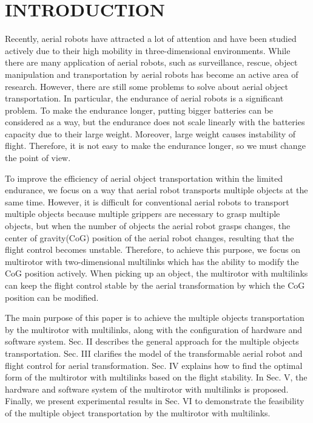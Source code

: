 \section{INTRODUCTION}
Recently, aerial robots have attracted a lot of attention and have been studied actively due to their high mobility in three-dimensional environments\cite{Kumar2012}. While there are many application of aerial robots, such as surveillance\cite{surveillance}, rescue\cite{rescue}, object manipulation and transportation by aerial robots has become an active area of research\cite{lindsey2012}\cite{Mellinger2011}\cite{ZhaoICRA2017}\cite{Bernard2009}\cite{Hugh2012}. However, there are still some problems to solve about aerial object transportation. In particular, the endurance of aerial robots is a significant problem. To make the endurance longer, putting bigger batteries can be considered as a way, but the endurance does not scale linearly with the batteries capacity due to their large weight. Moreover, large weight causes instability of flight. Therefore, it is not easy to make the endurance longer, so we must change the point of view. 
\par
To improve the efficiency of aerial object transportation within the limited endurance, we focus on a way that aerial robot transports multiple objects at the same time. However, it is difficult for conventional aerial robots to transport multiple objects because multiple grippers are necessary to grasp multiple objects, but when the number of objects the aerial robot grasps changes, the center of gravity(CoG) position of the aerial robot changes, resulting that the flight control becomes unstable. Therefore, to achieve this purpose, we focus on multirotor with two-dimensional multilinks\cite{Zhao2016} which has the ability to modify the CoG position actively. When picking up an object, the multirotor with multilinks can keep the flight control stable by the aerial transformation by which the CoG position can be modified. 
\par
The main purpose of this paper is to achieve the multiple objects transportation by the multirotor with multilinks, along with the configuration of hardware and software system. Sec. II describes the general approach for the multiple objects transportation. Sec. III clarifies the model of the transformable aerial robot and flight control for aerial transformation.  Sec. IV explains how to find the optimal form of the multirotor with multilinks based on the flight stability. In Sec. V, the hardware and software system of the multirotor with multilinks is proposed. Finally, we present experimental results in Sec. VI to demonstrate the feasibility of the multiple object transportation by the multirotor with multilinks. 
